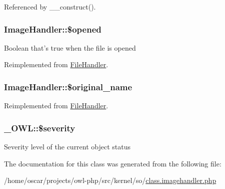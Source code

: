 Referenced by \_\-\_\-construct().

\subsubsection[{\$opened}]{\setlength{\rightskip}{0pt plus 5cm}ImageHandler::\$opened}\label{classImageHandler_a6a87b3626bd0a457c6937b3e9b1cc69b}
Boolean that's true when the file is opened 

Reimplemented from \hyperlink{classFileHandler_a061409b2bbd2e13bc47415527c0de720}{FileHandler}.

\subsubsection[{\$original\_\-name}]{\setlength{\rightskip}{0pt plus 5cm}ImageHandler::\$original\_\-name}\label{classImageHandler_a1712c9444d65879aab111260767afaab}


Reimplemented from \hyperlink{classFileHandler_a477708585850c3c8725ccf56bfe0b4a8}{FileHandler}.

\subsubsection[{\$severity}]{\setlength{\rightskip}{0pt plus 5cm}\_\-OWL::\$severity}\label{class__OWL_ad26b40a9dbbacb33e299b17826f8327c}
Severity level of the current object status 

The documentation for this class was generated from the following file:\begin{DoxyCompactItemize}
\item 
/home/oscar/projects/owl-\/php/src/kernel/so/\hyperlink{class_8imagehandler_8php}{class.imagehandler.php}\end{DoxyCompactItemize}

